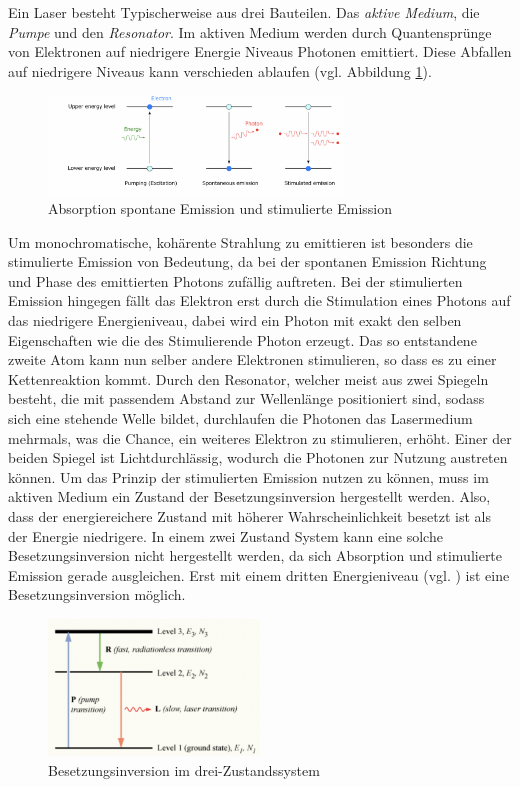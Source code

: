 Ein Laser besteht Typischerweise aus drei Bauteilen. Das \textit{aktive Medium}, die \textit{Pumpe} und den \textit{Resonator}.
Im aktiven Medium werden durch Quantensprünge von Elektronen auf niedrigere Energie Niveaus Photonen emittiert.
Diese Abfallen auf niedrigere Niveaus kann verschieden ablaufen (vgl. Abbildung \ref{fig:emmision}).
\begin{figure}[h]
    \centering
    \includegraphics[width=0.7\textwidth]{abb/emission.png}
    \caption{Absorption spontane Emission und stimulierte Emission \cite{emission}}
    \label{fig:emmision}
\end{figure}
Um monochromatische, kohärente Strahlung zu emittieren ist besonders die stimulierte Emission von Bedeutung,
da bei der spontanen Emission Richtung und Phase des emittierten Photons zufällig auftreten.
Bei der stimulierten Emission hingegen fällt das Elektron erst durch die Stimulation eines Photons auf das niedrigere Energieniveau,
dabei wird ein Photon mit exakt den selben Eigenschaften wie die des Stimulierende Photon erzeugt.
Das so entstandene zweite Atom kann nun selber andere Elektronen stimulieren,
so dass es zu einer Kettenreaktion kommt. 
Durch den Resonator, 
welcher meist aus zwei Spiegeln besteht,
die mit passendem Abstand zur Wellenlänge positioniert sind,
sodass sich eine stehende Welle bildet,
durchlaufen die Photonen das Lasermedium mehrmals,
was die Chance, ein weiteres Elektron zu stimulieren, erhöht. 
Einer der beiden Spiegel ist Lichtdurchlässig, wodurch die Photonen zur Nutzung austreten können.
Um das Prinzip der stimulierten Emission nutzen zu können,
muss im aktiven Medium ein Zustand der Besetzungsinversion hergestellt werden.
Also, 
dass der energiereichere Zustand mit höherer Wahrscheinlichkeit besetzt ist als der Energie niedrigere.
In einem zwei Zustand System kann eine solche Besetzungsinversion nicht hergestellt werden,
da sich Absorption und stimulierte Emission gerade ausgleichen.  
Erst mit einem dritten Energieniveau (vgl. ) ist eine Besetzungsinversion möglich.
\begin{figure}[h]
    \centering
    \includegraphics[width=0.5\textwidth]{abb/dreiniveau.png}
    \caption{Besetzungsinversion im drei-Zustandssystem \cite{enwiki}}
    \label{fig:dreiniveau}
\end{figure}
